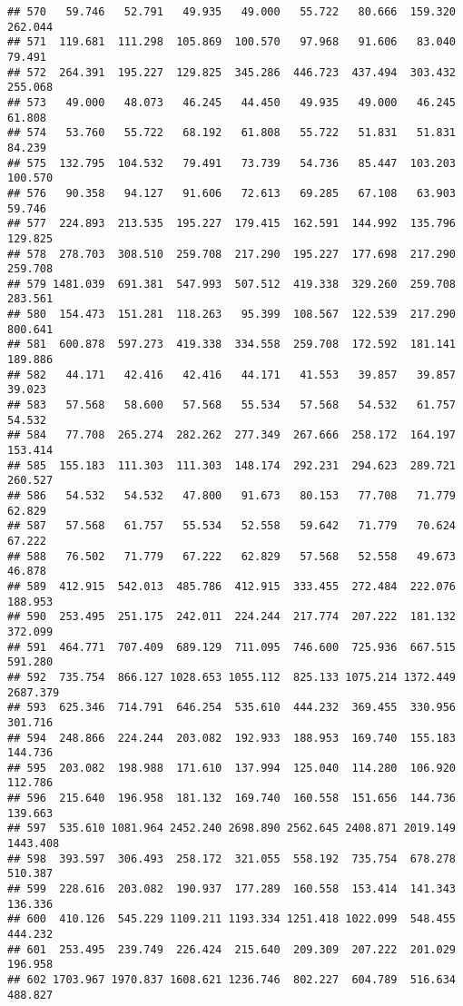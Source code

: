 \documentclass[
]{article}
\begin{document}
\begin{verbatim}
## 570   59.746   52.791   49.935   49.000   55.722   80.666  159.320  262.044
## 571  119.681  111.298  105.869  100.570   97.968   91.606   83.040   79.491
## 572  264.391  195.227  129.825  345.286  446.723  437.494  303.432  255.068
## 573   49.000   48.073   46.245   44.450   49.935   49.000   46.245   61.808
## 574   53.760   55.722   68.192   61.808   55.722   51.831   51.831   84.239
## 575  132.795  104.532   79.491   73.739   54.736   85.447  103.203  100.570
## 576   90.358   94.127   91.606   72.613   69.285   67.108   63.903   59.746
## 577  224.893  213.535  195.227  179.415  162.591  144.992  135.796  129.825
## 578  278.703  308.510  259.708  217.290  195.227  177.698  217.290  259.708
## 579 1481.039  691.381  547.993  507.512  419.338  329.260  259.708  283.561
## 580  154.473  151.281  118.263   95.399  108.567  122.539  217.290  800.641
## 581  600.878  597.273  419.338  334.558  259.708  172.592  181.141  189.886
## 582   44.171   42.416   42.416   44.171   41.553   39.857   39.857   39.023
## 583   57.568   58.600   57.568   55.534   57.568   54.532   61.757   54.532
## 584   77.708  265.274  282.262  277.349  267.666  258.172  164.197  153.414
## 585  155.183  111.303  111.303  148.174  292.231  294.623  289.721  260.527
## 586   54.532   54.532   47.800   91.673   80.153   77.708   71.779   62.829
## 587   57.568   61.757   55.534   52.558   59.642   71.779   70.624   67.222
## 588   76.502   71.779   67.222   62.829   57.568   52.558   49.673   46.878
## 589  412.915  542.013  485.786  412.915  333.455  272.484  222.076  188.953
## 590  253.495  251.175  242.011  224.244  217.774  207.222  181.132  372.099
## 591  464.771  707.409  689.129  711.095  746.600  725.936  667.515  591.280
## 592  735.754  866.127 1028.653 1055.112  825.133 1075.214 1372.449 2687.379
## 593  625.346  714.791  646.254  535.610  444.232  369.455  330.956  301.716
## 594  248.866  224.244  203.082  192.933  188.953  169.740  155.183  144.736
## 595  203.082  198.988  171.610  137.994  125.040  114.280  106.920  112.786
## 596  215.640  196.958  181.132  169.740  160.558  151.656  144.736  139.663
## 597  535.610 1081.964 2452.240 2698.890 2562.645 2408.871 2019.149 1443.408
## 598  393.597  306.493  258.172  321.055  558.192  735.754  678.278  510.387
## 599  228.616  203.082  190.937  177.289  160.558  153.414  141.343  136.336
## 600  410.126  545.229 1109.211 1193.334 1251.418 1022.099  548.455  444.232
## 601  253.495  239.749  226.424  215.640  209.309  207.222  201.029  196.958
## 602 1703.967 1970.837 1608.621 1236.746  802.227  604.789  516.634  488.827

\end{verbatim}
\end{document}

